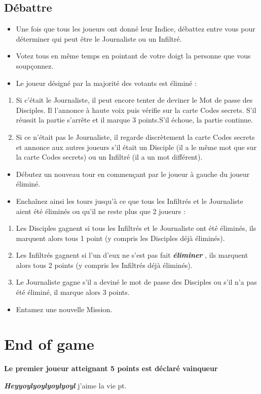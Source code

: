 \documentclass{article}%
\begin{document}
\subsection{ Débattre
}%
\label{subsec:Dbattre}%
\begin{itemize}%
\item%
%
 Une fois que tous les joueurs ont donné leur Indice, débattez entre vous pour déterminer qui peut être le Journaliste ou un Infiltré.
%
\item%
%
 Votez tous en même temps en pointant de votre doigt la personne que vous soupçonnez.
%
\item%
%
 Le joueur désigné par la majorité des votants est éliminé :
%
\end{itemize}%
\begin{enumerate}%
\item%
%
 Si c’était le Journaliste, il peut encore tenter de deviner le Mot de passe des Disciples. Il l'annonce à haute voix puis vérifie sur la carte Codes secrets. S’il réussit la partie s’arrête et il marque 3 points.S’il échoue, la partie continue.
%
\item%
%
 Si ce n’était pas le Journaliste, il regarde discrètement la carte Codes secrets et annonce aux autres joueurs s’il était un Disciple (il a le même mot que sur la carte Codes secrets) ou un Infiltré (il a un mot différent).
%
\end{enumerate}%
\begin{itemize}%
\item%
%
 Débutez un nouveau tour en commençant par le joueur à gauche du joueur éliminé.
%
\item%
%
 Enchaînez ainsi les tours jusqu’à ce que tous les Infiltrés et le Journaliste aient été éliminés ou qu’il ne reste plus que 2 joueurs :
%
\end{itemize}%
\begin{enumerate}%
\item%
%
 Les Disciples gagnent si tous les Infiltrés et le Journaliste ont été éliminés, ils marquent alors tous 1 point (y compris les Disciples déjà éliminés).
%
\item%
%
 Les Infiltrés gagnent si l'un d'eux ne s'est pas fait %
\textbf{\textit{éliminer}}%
 , ils marquent alors tous 2 points (y compris les Infiltrés déjà éliminés).
%
\item%
%
 Le Journaliste gagne s'il a deviné le mot de passe des Disciples ou s'il n'a pas été éliminé, il marque alors 3 points.
%
\end{enumerate}%
\begin{itemize}%
\item%
%
 Entamez une nouvelle Mission.
%
\end{itemize}

%
\section{ End of game
}%
\label{sec:Endofgame}%
\textbf{Le premier joueur atteignant 5 points est déclaré vainqueur}%

%
\textbf{\textit{Heyyoylyoylyoylyoyl}}%
 j'aime la vie pt.

%
\end{document}
